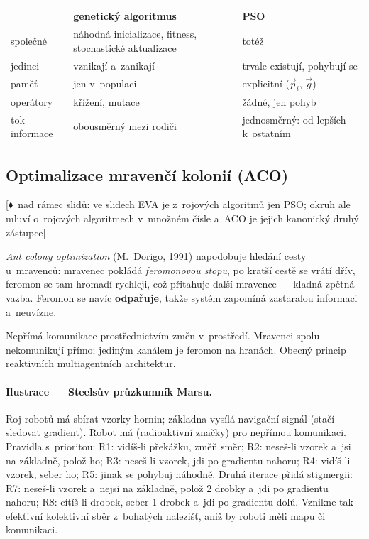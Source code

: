 \documentclass[11pt,a4paper]{article}
\theoremstyle{definition}
\newcommand{\mimoq}[1]{\textcolor{markcol}{\textsf{\footnotesize[$\blacklozenge$~nad rámec slidů: #1]}}}
\begin{document}
\begin{center}
\begin{tabular}{@{}p{5cm}p{5cm}p{5.2cm}@{}}
\toprule
 & \textbf{genetický algoritmus} & \textbf{PSO} \\
\midrule
společné & náhodná inicializace, fitness, stochastické aktualizace &
  totéž \\
jedinci & vznikají a~zanikají & trvale existují, pohybují se \\
paměť & jen v~populaci & explicitní ($\vec p_i$, $\vec g$) \\
operátory & křížení, mutace & žádné, jen pohyb \\
tok informace & obousměrný mezi rodiči & jednosměrný: od lepších k~ostatním \\
\bottomrule
\end{tabular}
\end{center}

\subsection{Optimalizace mravenčí kolonií (ACO)}

\noindent\mimoq{ve slidech EVA je z~rojových algoritmů jen PSO; okruh ale mluví
o~rojových algoritmech v~množném čísle a~ACO je jejich kanonický druhý zástupce}

\emph{Ant colony optimization} (M.~Dorigo, 1991) napodobuje hledání cesty
u~mravenců: mravenec pokládá \emph{feromonovou stopu}, po kratší cestě se
vrátí dřív, feromon se tam hromadí rychleji, což přitahuje další mravence ---
kladná zpětná vazba. Feromon se navíc \textbf{odpařuje}, takže systém
zapomíná zastaralou informaci a~neuvízne.

\begin{defbox}[Stigmergie]
Nepřímá komunikace prostřednictvím změn v~prostředí. Mravenci spolu
nekomunikují přímo; jediným kanálem je feromon na hranách. Obecný princip
reaktivních multiagentních architektur.
\end{defbox}

\paragraph{Ilustrace --- Steelsův průzkumník Marsu.} Roj robotů má sbírat
vzorky hornin; základna vysílá navigační signál (stačí sledovat gradient).
Robot má  (radioaktivní značky) pro nepřímou komunikaci. Pravidla
s~prioritou:
R1: vidíš-li překážku, změň směr; R2: neseš-li vzorek a~jsi na základně,
polož ho; R3: neseš-li vzorek, jdi po gradientu nahoru; R4: vidíš-li vzorek,
seber ho; R5: jinak se pohybuj náhodně.
Druhá iterace přidá stigmergii: R7: neseš-li vzorek a~nejsi na základně,
polož 2 drobky a~jdi po gradientu nahoru; R8: cítíš-li drobek, seber 1 drobek
a~jdi po gradientu dolů. Vznikne tak efektivní kolektivní sběr
z~bohatých nalezišť, aniž by roboti měli mapu či komunikaci.
\end{document}
